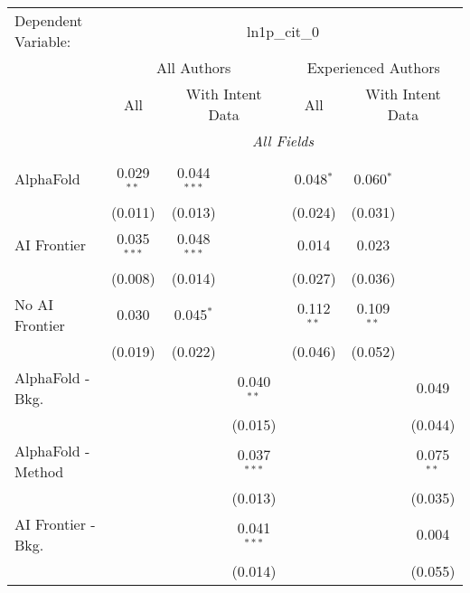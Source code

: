 \begingroup
\centering
\begin{tabular}{lcccccc}
   \tabularnewline \midrule \midrule
   Dependent Variable: & \multicolumn{6}{c}{ln1p\_cit\_0}\\
 & \multicolumn{3}{c}{All Authors} & \multicolumn{3}{c}{Experienced Authors} \\
\cmidrule(lr){2-4} \cmidrule(lr){5-7}
 & \multicolumn{1}{c}{All} & \multicolumn{2}{c}{With Intent Data} & \multicolumn{1}{c}{All} & \multicolumn{2}{c}{With Intent Data} \\
\cmidrule(lr){2-2} \cmidrule(lr){3-4} \cmidrule(lr){5-5} \cmidrule(lr){6-7}
 & \multicolumn{6}{c}{\textit{All Fields}} \\ \\
   AlphaFold               & 0.029$^{**}$  & 0.044$^{***}$ &               & 0.048$^{*}$  & 0.060$^{*}$  &   \\   
                           & (0.011)       & (0.013)       &               & (0.024)      & (0.031)      &   \\   
   AI Frontier             & 0.035$^{***}$ & 0.048$^{***}$ &               & 0.014        & 0.023        &   \\   
                           & (0.008)       & (0.014)       &               & (0.027)      & (0.036)      &   \\   
   No AI Frontier          & 0.030         & 0.045$^{*}$   &               & 0.112$^{**}$ & 0.109$^{**}$ &   \\   
                           & (0.019)       & (0.022)       &               & (0.046)      & (0.052)      &   \\   
   AlphaFold - Bkg.        &               &               & 0.040$^{**}$  &              &              & 0.049\\   
                           &               &               & (0.015)       &              &              & (0.044)\\   
   AlphaFold - Method      &               &               & 0.037$^{***}$ &              &              & 0.075$^{**}$\\   
                           &               &               & (0.013)       &              &              & (0.035)\\   
   AI Frontier - Bkg.      &               &               & 0.041$^{***}$ &              &              & 0.004\\   
                           &               &               & (0.014)       &              &              & (0.055)\\   

\end{tabular}
